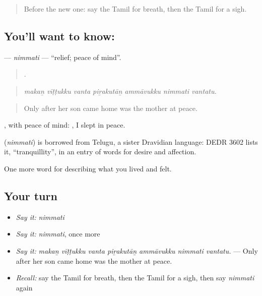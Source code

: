 \label{lesson:TA-C456-nimmati}



\begin{quote}
Before the new one: say the Tamil for breath, then the Tamil for a sigh.
\end{quote}

\subsection*{You'll want to know: }
\textbf{} — \emph{nimmati} — \textquotedblleft{}relief; peace of mind\textquotedblright{}.

\begin{quote}
      .
\end{quote}

\begin{quote}
\emph{makaṉ vīṭṭukku vanta piṟakutāṉ ammāvukku nimmati vantatu.}
\end{quote}

\begin{quote}
Only after her son came home was the mother at peace.
\end{quote}

, with peace of mind:  , I slept in peace.

\begin{cousinweb}
\textbf{} (\emph{nimmati}) is borrowed from Telugu, a sister Dravidian language: DEDR 3602 lists it, \textquotedblleft{}tranquillity\textquotedblright{}, in an entry of words for desire and affection.
\end{cousinweb}

\begin{grammarlens}[title={What you've built}]
One more word for describing what you lived and felt.
\end{grammarlens}

\subsection*{Your turn}
\begin{itemize}
\raggedright
  \item \emph{Say it:} \emph{nimmati}
  \item \emph{Say it:} \emph{nimmati}, once more
  \item \emph{Say it:} \emph{makaṉ vīṭṭukku vanta piṟakutāṉ ammāvukku nimmati vantatu.} — Only after her son came home was the mother at peace.
  \item \emph{Recall:} say the Tamil for breath, then the Tamil for a sigh, then say \emph{nimmati} again
\end{itemize}

